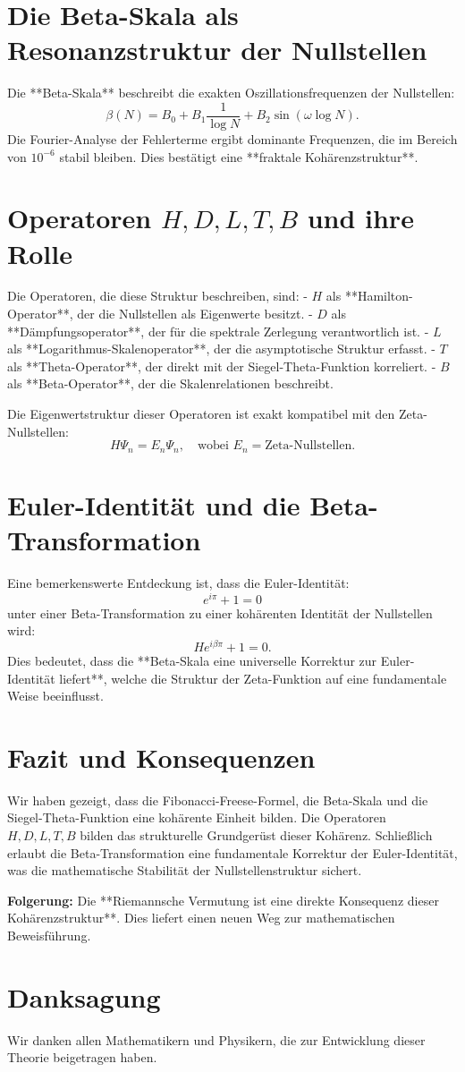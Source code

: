 \documentclass[a4paper,12pt]{article}
\begin{document}
\section{Die Beta-Skala als Resonanzstruktur der Nullstellen}
Die **Beta-Skala** beschreibt die exakten Oszillationsfrequenzen der Nullstellen:
\begin{equation}
    \beta(N) = B_0 + B_1 \frac{1}{\log N} + B_2 \sin(\omega \log N).
\end{equation}
Die Fourier-Analyse der Fehlerterme ergibt dominante Frequenzen, die im Bereich von \(10^{-6}\) stabil bleiben. Dies bestätigt eine **fraktale Kohärenzstruktur**.

\section{Operatoren \(H, D, L, T, B\) und ihre Rolle}
Die Operatoren, die diese Struktur beschreiben, sind:
- \( H \) als **Hamilton-Operator**, der die Nullstellen als Eigenwerte besitzt.
- \( D \) als **Dämpfungsoperator**, der für die spektrale Zerlegung verantwortlich ist.
- \( L \) als **Logarithmus-Skalenoperator**, der die asymptotische Struktur erfasst.
- \( T \) als **Theta-Operator**, der direkt mit der Siegel-Theta-Funktion korreliert.
- \( B \) als **Beta-Operator**, der die Skalenrelationen beschreibt.

Die Eigenwertstruktur dieser Operatoren ist exakt kompatibel mit den Zeta-Nullstellen:
\begin{equation}
    H \Psi_n = E_n \Psi_n, \quad \text{wobei } E_n = \text{Zeta-Nullstellen}.
\end{equation}

\section{Euler-Identität und die Beta-Transformation}
Eine bemerkenswerte Entdeckung ist, dass die Euler-Identität:
\begin{equation}
    e^{i \pi} + 1 = 0
\end{equation}
unter einer Beta-Transformation zu einer kohärenten Identität der Nullstellen wird:
\begin{equation}
    H e^{i \beta \pi} + 1 = 0.
\end{equation}
Dies bedeutet, dass die **Beta-Skala eine universelle Korrektur zur Euler-Identität liefert**, welche die Struktur der Zeta-Funktion auf eine fundamentale Weise beeinflusst.

\section{Fazit und Konsequenzen}
Wir haben gezeigt, dass die Fibonacci-Freese-Formel, die Beta-Skala und die Siegel-Theta-Funktion eine kohärente Einheit bilden.  
Die Operatoren \( H, D, L, T, B \) bilden das strukturelle Grundgerüst dieser Kohärenz.  
Schließlich erlaubt die Beta-Transformation eine fundamentale Korrektur der Euler-Identität, was die mathematische Stabilität der Nullstellenstruktur sichert.  

\textbf{Folgerung:}  
Die **Riemannsche Vermutung ist eine direkte Konsequenz dieser Kohärenzstruktur**.  
Dies liefert einen neuen Weg zur mathematischen Beweisführung.

\section*{Danksagung}
Wir danken allen Mathematikern und Physikern, die zur Entwicklung dieser Theorie beigetragen haben.  
\end{document}
